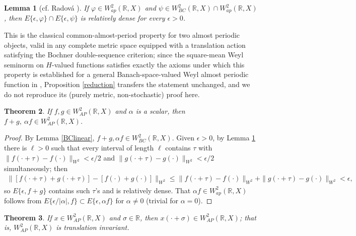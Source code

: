 \documentclass[11pt]{amsart}
\newtheorem{theorem}{Theorem}[section]
\newtheorem{lemma}[theorem]{Lemma}
\begin{document}
\begin{lemma}[cf. Radov\'a \cite{Radova}]\label{commonperiod}
If $\varphi\in W^2_{ap}(\mathbb R,X)$ and $\psi\in W^2_{BC}(\mathbb R,X)\cap W^2_{ap}(\mathbb R,X)$, then $E\{\epsilon,\varphi\}\cap E\{\epsilon,\psi\}$ is relatively dense for every $\epsilon>0$.
\end{lemma}

This is the classical common-almost-period property for two almost periodic objects, valid in any complete metric space equipped with a translation action satisfying the Bochner double-sequence criterion; since the square-mean Weyl seminorm on $H$-valued functions satisfies exactly the axioms under which this property is established for a general Banach-space-valued Weyl almost periodic function in \cite{LiWeyl}, Proposition \ref{reduction} transfers the statement unchanged, and we do not reproduce its (purely metric, non-stochastic) proof here.

\begin{theorem}\label{APlinear}
If $f,g\in W^2_{AP}(\mathbb R,X)$ and $\alpha$ is a scalar, then $f+g,\ \alpha f\in W^2_{AP}(\mathbb R,X)$.
\end{theorem}

\begin{proof}
By Lemma \ref{BClinear}, $f+g,\alpha f\in W^2_{BC}(\mathbb R,X)$. Given $\epsilon>0$, by Lemma \ref{commonperiod} there is $\ell>0$ such that every interval of length $\ell$ contains $\tau$ with $\|f(\cdot+\tau)-f(\cdot)\|_{W^2}<\epsilon/2$ and $\|g(\cdot+\tau)-g(\cdot)\|_{W^2}<\epsilon/2$ simultaneously; then
\begin{align*}
\|[f(\cdot+\tau)+g(\cdot+\tau)]-[f(\cdot)+g(\cdot)]\|_{W^2}\le\|f(\cdot+\tau)-f(\cdot)\|_{W^2}+\|g(\cdot+\tau)-g(\cdot)\|_{W^2}<\epsilon,
\end{align*}
so $E\{\epsilon,f+g\}$ contains such $\tau$'s and is relatively dense. That $\alpha f\in W^2_{ap}(\mathbb R,X)$ follows from $E\{\epsilon/|\alpha|,f\}\subset E\{\epsilon,\alpha f\}$ for $\alpha\ne0$ (trivial for $\alpha=0$).
\end{proof}

\begin{theorem}\label{APtrans}
If $x\in W^2_{AP}(\mathbb R,X)$ and $\sigma\in\mathbb R$, then $x(\cdot+\sigma)\in W^2_{AP}(\mathbb R,X)$; that is, $W^2_{AP}(\mathbb R,X)$ is translation invariant.
\end{theorem}
\end{document}
